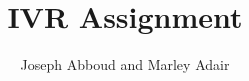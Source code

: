 \documentclass{article}
\begin{document}
\title{IVR Assignment}
\author{Joseph Abboud and Marley Adair}
\date{}
\maketitle
\end{document}
